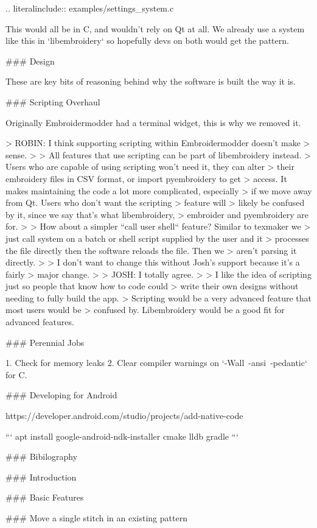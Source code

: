 .. literalinclude:: examples/settings\_system.c

This would all be in C, and wouldn't rely on Qt at all. We already use a
system like this in `libembroidery` so hopefully devs on both
would get the pattern.

### Design

These are key bits of reasoning behind why the software is built the way it is.

### Scripting Overhaul

Originally Embroidermodder had a terminal widget, this is why we removed it.

> ROBIN: I think supporting scripting within Embroidermodder doesn't make
> sense.
>
> All features that use scripting can be part of libembroidery instead.
> Users who are capable of using scripting won't need it, they can alter
> their embroidery files in CSV format, or import pyembroidery to get
> access. It makes maintaining the code a lot more complicated, especially
> if we move away from Qt. Users who don't want the scripting > feature will
> likely be confused by it, since we say that's what  libembroidery,
> embroider and pyembroidery are for.
>
> How about a simpler ``call user shell`` feature? Similar to texmaker we
> just call system on a batch or shell script supplied by the user and it
> processes the file directly then the software reloads the file. Then we
> aren't parsing it directly.
>
> I don't want to change this without Josh's support because it's a fairly
> major change.
>
> JOSH: I totally agree.
>
> I like the idea of scripting just so people that know how to code could
> write their own designs without needing to fully build the app.
> Scripting would be a very advanced feature that most users would be
> confused by. Libembroidery would be a good fit for advanced features.

### Perennial Jobs

1. Check for memory leaks
2. Clear compiler warnings on `-Wall\ -ansi\ -pedantic` for C.

### Developing for Android

https://developer.android.com/studio/projects/add-native-code

```
apt install google-android-ndk-installer cmake lldb gradle
```

### Bibilography

### Introduction

### Basic Features

### Move a single stitch in an existing pattern

